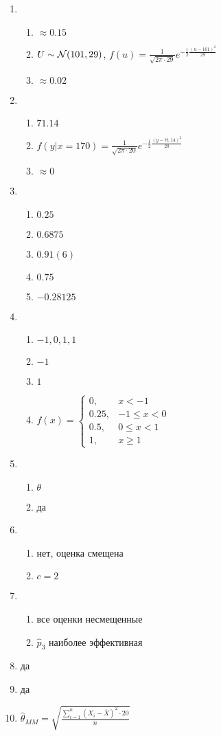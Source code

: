 \begin{multicols}{2}
\begin{enumerate}
\item
\begin{enumerate}
\item $\approx 0.15$
\item $U \sim \mathcal{N}(101,29)$, $f(u) = \frac{1}{\sqrt{2\pi\cdot 29}}e^{-\frac{1}{2}\frac{(u-101)^2}{29}}$
\item $\approx 0.02$
\end{enumerate}
\item
\begin{enumerate}
\item $71.14$
\item $f(y|x=170) = \frac{1}{\sqrt{2\pi\cdot20}}e^{-\frac{1}{2}\frac{(y-71.14)^2}{20}}$
\item $\approx 0$
\end{enumerate}
\item
\begin{enumerate}
\item $0.25$
\item $0.6875$
\item $0.91(6)$
\item $0.75$
\item $-0.28125$
\end{enumerate}
\item
\begin{enumerate}
\item $-1, 0, 1, 1$
\item $-1$
\item $1$
\item $f(x) = \begin{cases}
0, & x < -1 \\
0.25, & -1 \leq x < 0 \\
0.5, & 0 \leq x < 1 \\
1, & x \geq 1
\end{cases}$
\end{enumerate}
\item
\begin{enumerate}
\item $\theta$
\item да
\end{enumerate}

\item
\begin{enumerate}
\item нет, оценка смещена
\item $c = 2$
\end{enumerate}
\item
\begin{enumerate}
\item все оценки несмещенные
\item $\hat{p}_3$ наиболее эффективная
\end{enumerate}
\item да
\item да
\item $\hat{\theta}_{MM} = \sqrt{\frac{\sum_{i=1}^n(X_i-\overline{X})^2\cdot20}{n}}$


\end{enumerate}
\end{multicols}
